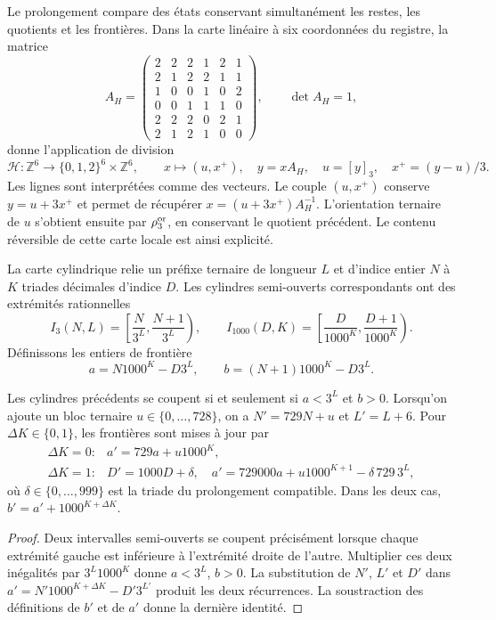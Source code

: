 Le prolongement compare des états conservant simultanément les restes, les quotients et les frontières. Dans la carte linéaire à six coordonnées du registre, la matrice
\[
 A_H=\begin{pmatrix}
 2&2&2&1&2&1\\2&1&2&2&1&1\\1&0&0&1&0&2\\
 0&0&1&1&1&0\\2&2&2&0&2&1\\2&1&2&1&0&0
 \end{pmatrix},\qquad\det A_H=1,
\]
donne l'application de division
\begin{equation}
 \mathcal H:\mathbb Z^6\longrightarrow
 \{0,1,2\}^6\times\mathbb Z^6,\qquad
 x\longmapsto(u,x^+),\quad
 y=xA_H,\quad u=[y]_3,\quad x^+=(y-u)/3.
 \label{ii:ii:tpk-hensel-local}
\end{equation}
Les lignes sont interprétées comme des vecteurs. Le couple \((u,x^+)\) conserve \(y=u+3x^+\) et permet de récupérer \(x=(u+3x^+)A_H^{-1}\). L’orientation ternaire de \(u\) s’obtient ensuite par \(\rho_3^{\rm or}\), en conservant le quotient précédent. Le contenu réversible de cette carte locale est ainsi explicité.

La carte cylindrique relie un préfixe ternaire de longueur \(L\) et d’indice entier \(N\) à \(K\) triades décimales d’indice \(D\). Les cylindres semi-ouverts correspondants ont des extrémités rationnelles
\[
 I_3(N,L)=\left[\frac N{3^L},\frac{N+1}{3^L}\right),\qquad
 I_{1000}(D,K)=\left[\frac D{1000^K},\frac{D+1}{1000^K}\right).
\]
Définissons les entiers de frontière
\[
 a=N1000^K-D3^L,\qquad b=(N+1)1000^K-D3^L.
\]

\begin{lemma}
\label{ii:ii:tpk-cilindros-enteros}
Les cylindres précédents se coupent si et seulement si \(a<3^L\) et \(b>0\). Lorsqu'on ajoute un bloc ternaire \(u\in\{0,\ldots,728\}\), on a \(N'=729N+u\) et \(L'=L+6\). Pour \(\Delta K\in\{0,1\}\), les frontières sont mises à jour par
\[
 \begin{array}{ll}
 \Delta K=0:&a'=729a+u1000^K,\\[2pt]
 \Delta K=1:&D'=1000D+\delta,\quad
 a'=729000a+u1000^{K+1}-\delta\,729\,3^L,
 \end{array}
\]
où \(\delta\in\{0,\ldots,999\}\) est la triade du prolongement compatible. Dans les deux cas, \(b'=a'+1000^{K+\Delta K}\).
\end{lemma}
\begin{proof}
Deux intervalles semi-ouverts se coupent précisément lorsque chaque extrémité gauche est inférieure à l'extrémité droite de l'autre. Multiplier ces deux inégalités par \(3^L1000^K\) donne \(a<3^L\), \(b>0\). La substitution de \(N'\), \(L'\) et \(D'\) dans \(a'=N'1000^{K+\Delta K}-D'3^{L'}\) produit les deux récurrences. La soustraction des définitions de \(b'\) et de \(a'\) donne la dernière identité.
\end{proof}


